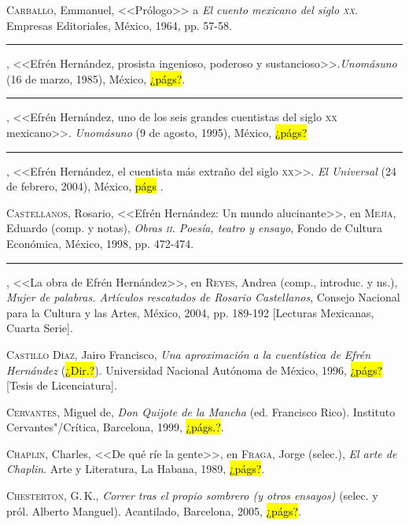 \documentclass[14pt,twoside,final]{extbook} %
\begin{document}
\textsc{Carballo}, Emmanuel, <<Prólogo>> a \emph{El cuento mexicano del siglo \textsc{xx}}. Empresas Editoriales, México, 1964, pp. 57-58.\label{bib:carballo1964}

\rule{1cm}{0.4pt}, <<Efrén Hernández, prosista ingenioso, poderoso y sustancioso>>.\newline \emph{Unomásuno} (16 de marzo, 1985), México, \hl{¿págs?}.\label{bib:carballo1985}

\rule{1cm}{0.4pt}, <<Efrén Hernández, uno de los seis grandes cuentistas del siglo \textsc{xx} mexicano>>. \emph{Unomásuno} (9 de agosto, 1995), México, \hl{¿págs?}\label{bib:carballo1995}

\rule{1cm}{0.4pt}, <<Efrén Hernández, el cuentista más extraño del siglo \textsc{xx}>>. \emph{El Universal} (24 de febrero, 2004), México, \hl{págs} .\label{bib:carballo2004}

\textsc{Castellanos}, Rosario, <<Efrén Hernández: Un mundo alucinante>>, en \textsc{Mejía}, Eduardo (comp. y notas), \emph{Obras \textsc{ii}. Poesía, teatro y ensayo}, Fondo de Cultura Económica, México, 1998, pp. 472-474.\label{bib:castellanos1998}

\rule{1cm}{0.4pt}, <<La obra de Efrén Hernández>>, en \textsc{Reyes}, Andrea (comp., introduc. y ns.), \emph{Mujer de palabras. Artículos rescatados de Rosario Castellanos}, Consejo Nacional para la Cultura y las Artes, México, 2004, pp. \mbox{189-192} [Lecturas Mexicanas, Cuarta Serie].\label{bib:castellanos2004}

\textsc{Castillo Díaz}, Jairo Francisco, \emph{Una aproximación a la cuentística de Efrén Hernández} (\hl{¿Dir.?}). Universidad Nacional Autónoma de México, 1996, \hl{¿págs?} [Tesis de Licenciatura].\label{bib:castillo1996}

\textsc{Cervantes}, Miguel de, \emph{Don Quijote de la Mancha} (ed. Francisco Rico). Instituto Cervantes"/Crítica, Barcelona, 1999, \hl{¿págs.?}.\label{bib:cervantes1999}

\textsc{Chaplin}, Charles, <<De qué ríe la gente>>, en \textsc{Fraga}, Jorge (selec.), \emph{El arte de Chaplin}. Arte y Literatura, La Habana, 1989, \hl{¿págs?}.\label{bib:chaplin1989}

\textsc{Chesterton}, G.\,K., \emph{Correr tras el propio sombrero (y otros ensayos)} (selec. y pról. Alberto Manguel). Acantilado, Barcelona, 2005, \hl{¿págs?}.\label{bib:chesterton2005}
\end{document}
